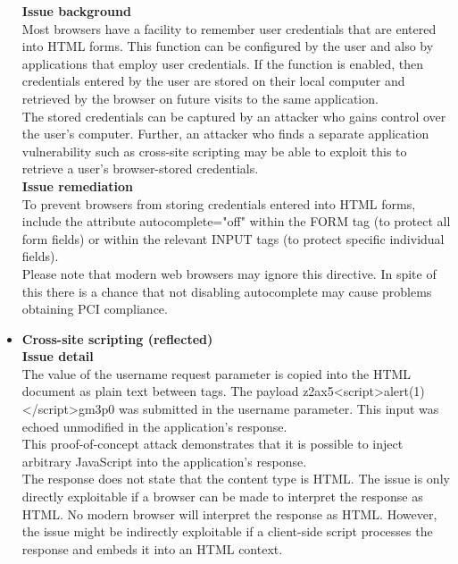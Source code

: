 \begin{itemize}
\textbf{Issue background} \\
Most browsers have a facility to remember user credentials that are entered into HTML forms. This function can be configured by the user and also by applications that employ user credentials. If the function is enabled, then credentials entered by the user are stored on their local computer and retrieved by the browser on future visits to the same application.\\

The stored credentials can be captured by an attacker who gains control over the user's computer. Further, an attacker who finds a separate application vulnerability such as cross-site scripting may be able to exploit this to retrieve a user's browser-stored credentials.\\

\textbf{Issue remediation} \\
To prevent browsers from storing credentials entered into HTML forms, include the attribute autocomplete="off" within the FORM tag (to protect all form fields) or within the relevant INPUT tags (to protect specific individual fields). \\

Please note that modern web browsers may ignore this directive. In spite of this there is a chance that not disabling autocomplete may cause problems obtaining PCI compliance.\\


\item \textbf{Cross-site scripting (reflected)} \\

\textbf{Issue detail} \\
The value of the username request parameter is copied into the HTML document as plain text between tags. The payload z2ax5<script>alert(1)</script>gm3p0 was submitted in the username parameter. This input was echoed unmodified in the application's response. \\

This proof-of-concept attack demonstrates that it is possible to inject arbitrary JavaScript into the application's response. \\

The response does not state that the content type is HTML. The issue is only directly exploitable if a browser can be made to interpret the response as HTML. No modern browser will interpret the response as HTML. However, the issue might be indirectly exploitable if a client-side script processes the response and embeds it into an HTML context. \\


\end{itemize}

